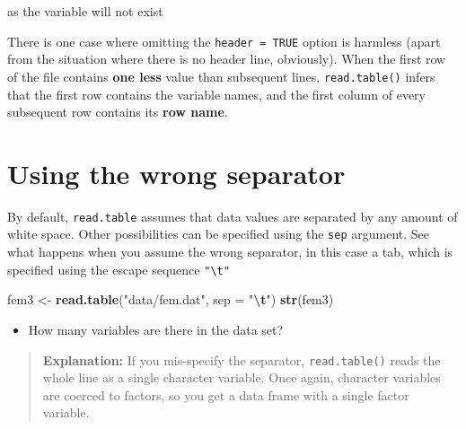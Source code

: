 \documentclass[
]{book}
\newenvironment{Shaded}{\begin{snugshade}}{\end{snugshade}}
\newcommand{\AttributeTok}[1]{\textcolor[rgb]{0.13,0.29,0.53}{#1}}
\newcommand{\FunctionTok}[1]{\textcolor[rgb]{0.13,0.29,0.53}{\textbf{#1}}}
\newcommand{\NormalTok}[1]{#1}
\newcommand{\OtherTok}[1]{\textcolor[rgb]{0.56,0.35,0.01}{#1}}
\newcommand{\SpecialCharTok}[1]{\textcolor[rgb]{0.81,0.36,0.00}{\textbf{#1}}}
\newcommand{\StringTok}[1]{\textcolor[rgb]{0.31,0.60,0.02}{#1}}
\providecommand{\tightlist}{%
  \setlength{\itemsep}{0pt}\setlength{\parskip}{0pt}}
\begin{document}
\begin{Shaded}
\end{Shaded}

as the variable will not exist

There is one case where omitting the \texttt{header\ =\ TRUE} option is
harmless (apart from the situation where there is no header line,
obviously). When the first row of the file contains \textbf{one less}
value than subsequent lines, \texttt{read.table()} infers that the first
row contains the variable names, and the first column of every
subsequent row contains its \textbf{row name}.

\section{Using the wrong separator}\label{using-the-wrong-separator}

By default, \texttt{read.table} assumes that data values are separated
by any amount of white space. Other possibilities can be specified
using the \texttt{sep} argument. See what happens when you assume the
wrong separator, in this case a tab, which is specified using the
escape sequence \texttt{"\textbackslash{}t"}

\begin{Shaded}
\begin{Highlighting}[]
\NormalTok{fem3 }\OtherTok{\textless{}{-}} \FunctionTok{read.table}\NormalTok{(}\StringTok{"data/fem.dat"}\NormalTok{, }\AttributeTok{sep =} \StringTok{"}\SpecialCharTok{\textbackslash{}t}\StringTok{"}\NormalTok{)}
\FunctionTok{str}\NormalTok{(fem3)}
\end{Highlighting}
\end{Shaded}

\begin{itemize}
\tightlist
\item
  How many variables are there in the data set?
\end{itemize}

\begin{quote}
\textbf{Explanation:} If you mis-specify the separator,
\texttt{read.table()} reads the whole line as a single character
variable. Once again, character variables are coerced to factors, so
you get a data frame with a single factor variable.
\end{quote}
\end{document}

